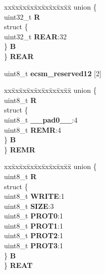 \begin{DoxyCompactItemize}
\begin{tabbing}
\end{tabbing}\item 
\mbox{\label{structECSM__tag_ab56daa0257838c4c0a1b69e73448a843}} 
\begin{tabbing}
xx\=xx\=xx\=xx\=xx\=xx\=xx\=xx\=xx\=\kill
union \{\\
\>uint32\_t {\bfseries R}\\
\>struct \{\\
\>\>uint32\_t {\bfseries REAR}:32\\
\>\} {\bfseries B}\\
\} {\bfseries REAR}\\

\end{tabbing}\item 
\mbox{\label{structECSM__tag_a052443806ac518f00f10e17d397767da}} 
uint8\+\_\+t {\bfseries ecsm\+\_\+reserved12} \mbox{[}2\mbox{]}
\item 
\mbox{\label{structECSM__tag_a922c9a9c11d59f5b9eec0ac646a39e42}} 
\begin{tabbing}
xx\=xx\=xx\=xx\=xx\=xx\=xx\=xx\=xx\=\kill
union \{\\
\>uint8\_t {\bfseries R}\\
\>struct \{\\
\>\>uint8\_t {\bfseries \_\_pad0\_\_}:4\\
\>\>uint8\_t {\bfseries REMR}:4\\
\>\} {\bfseries B}\\
\} {\bfseries REMR}\\

\end{tabbing}\item 
\mbox{\label{structECSM__tag_aed476ba251500488ca139f995d0a237c}} 
\begin{tabbing}
xx\=xx\=xx\=xx\=xx\=xx\=xx\=xx\=xx\=\kill
union \{\\
\>uint8\_t {\bfseries R}\\
\>struct \{\\
\>\>uint8\_t {\bfseries WRITE}:1\\
\>\>uint8\_t {\bfseries SIZE}:3\\
\>\>uint8\_t {\bfseries PROT0}:1\\
\>\>uint8\_t {\bfseries PROT1}:1\\
\>\>uint8\_t {\bfseries PROT2}:1\\
\>\>uint8\_t {\bfseries PROT3}:1\\
\>\} {\bfseries B}\\
\} {\bfseries REAT}\\


\end{tabbing}
\end{DoxyCompactItemize}
